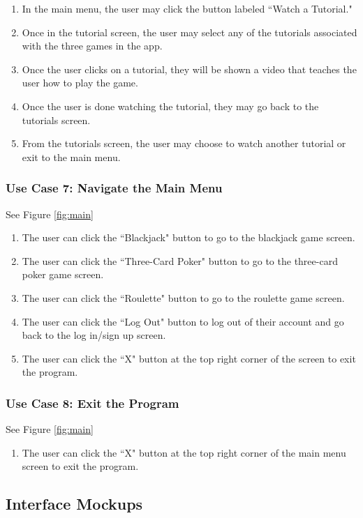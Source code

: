\documentclass[10pt,conference,onecolumn,compsoc]{IEEEtran}
\begin{document}
\begin{enumerate}
\item In the main menu, the user may click the button labeled ``Watch a Tutorial."
\item Once in the tutorial screen, the user may select any of the tutorials associated with the three games in the app.
\item Once the user clicks on a tutorial, they will be shown a video that teaches the user how to play the game.
\item Once the user is done watching the tutorial, they may go back to the tutorials screen.
\item From the tutorials screen, the user may choose to watch another tutorial or exit to the main menu.
\end{enumerate}

\subsubsection{Use Case 7: Navigate the Main Menu}
See Figure \ref{fig:main}
\begin{enumerate}
\item The user can click the ``Blackjack" button to go to the blackjack game screen.
\item The user can click the ``Three-Card Poker" button to go to the three-card poker game screen.
\item The user can click the ``Roulette" button to go to the roulette game screen.
\item The user can click the ``Log Out" button to log out of their account and go back to the log in/sign up screen.
\item The user can click the ``X" button at the top right corner of the screen to exit the program.
\end{enumerate}

\subsubsection{Use Case 8: Exit the Program}
See Figure \ref{fig:main}
\begin{enumerate}
\item The user can click the ``X" button at the top right corner of the main menu screen to exit the program.
\end{enumerate}

\newpage
\subsection{Interface Mockups}
\end{document}
